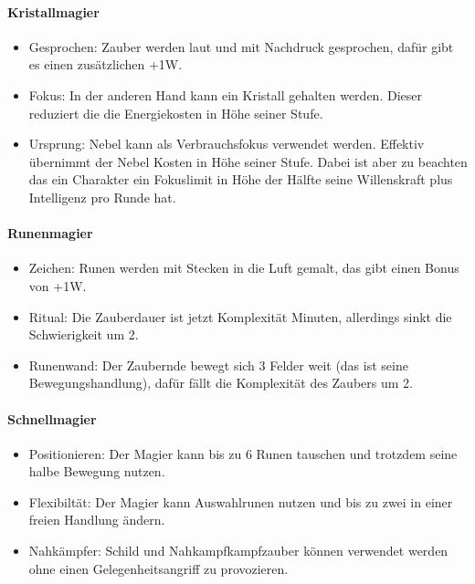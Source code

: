 \documentclass{article}
\begin{document}
\paragraph{Kristallmagier}

\begin{itemize}
\item Gesprochen: Zauber werden laut und mit Nachdruck gesprochen, dafür gibt es einen zusätzlichen +1W.
\item Fokus: In der anderen Hand kann ein Kristall gehalten werden. Dieser reduziert die die Energiekosten in Höhe seiner Stufe.
\item Ursprung: Nebel kann als Verbrauchsfokus verwendet werden. Effektiv übernimmt der Nebel Kosten in Höhe seiner Stufe. Dabei ist aber zu beachten das ein Charakter ein Fokuslimit in Höhe der Hälfte seine Willenskraft plus Intelligenz pro Runde hat.
\end{itemize}

\paragraph{Runenmagier}

\begin{itemize}
\item Zeichen: Runen werden mit Stecken in die Luft gemalt, das gibt einen Bonus von +1W.
\item Ritual: Die Zauberdauer ist jetzt Komplexität Minuten, allerdings sinkt die Schwierigkeit um 2.
\item Runenwand: Der Zaubernde bewegt sich 3 Felder weit (das ist seine Bewegungshandlung), dafür fällt die Komplexität des Zaubers um 2.
\end{itemize}

\paragraph{Schnellmagier}

\begin{itemize}
\item Positionieren: Der Magier kann bis zu 6 Runen tauschen und trotzdem seine halbe Bewegung nutzen.
\item Flexibiltät: Der Magier kann Auswahlrunen nutzen und bis zu zwei in einer freien Handlung ändern.
\item Nahkämpfer: Schild und Nahkampfkampfzauber können verwendet werden ohne einen Gelegenheitsangriff zu provozieren.
\end{itemize}
\end{document}

